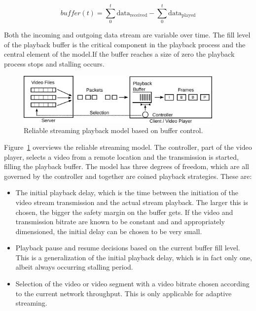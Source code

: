 \begin{equation*}
\mathit{buffer}(t) = \sum_{0}^{t} \text{data}_\mathrm{received} - \sum_{0}^{t} \text{data}_\mathrm{played}
\end{equation*}

Both the incoming and outgoing data stream are variable over time. The fill level of the playback buffer is the critical component in the playback process and the central element of the model.If the buffer reaches a size of zero the playback process stops and stalling occurs.


\begin{figure}[htb]
    \centering
    \includegraphics[width=0.9\textwidth]{images/playback-model.pdf}
    \caption{Reliable streaming playback model based on buffer control.}
    \label{c3:fig:playback-model}
\end{figure}

Figure~\ref{c3:fig:playback-model} overviews the reliable streaming model. The controller, part of the video player, selects a video from a remote location and the transmission is started, filling the playback buffer. The model has three degrees of freedom, which are all governed by the controller and together are coined playback strategies. These are:

\begin{itemize}
    \item The initial playback delay, which is the time between the initiation of the video stream transmission and the actual stream playback. The larger this is chosen, the bigger the safety margin on the buffer gets. If the video and transmission bitrate are known to be constant and and appropriately dimensioned, the initial delay can be chosen to be very small.
    \item Playback pause and resume decisions based on the current buffer fill level. This is a generalization of the initial playback delay, which is in fact only one, albeit always occurring stalling period.
    \item Selection of the video or video segment with a video bitrate chosen according to the current network throughput. This is only applicable for adaptive streaming.
\end{itemize}



